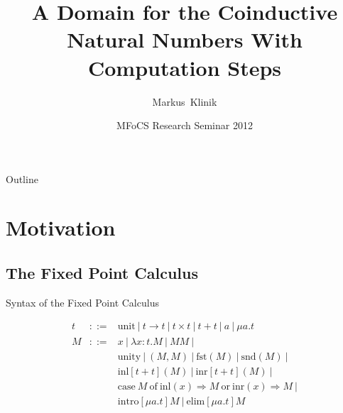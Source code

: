 \documentclass{beamer}
\title
{A Domain for the Coinductive Natural Numbers With Computation Steps}
\author
{Markus~Klinik}
\institute[Radboud University Nijmegen] %
{
  Radboud University Nijmegen
}
\date
{MFoCS Research Seminar 2012}
\newcommand{\arr}{\rightarrow}
\newcommand{\Arr}{\Rightarrow}
\begin{document}
\begin{frame}
  \titlepage
\end{frame}

\begin{frame}{Outline}
  \tableofcontents
\end{frame}





\section{Motivation}

\subsection{The Fixed Point Calculus}


\begin{frame}{Syntax of the Fixed Point Calculus}

  \begin{eqnarray*}
  t & ::= & \text{unit}\ |\ t \arr t\ |\ t \times t\ |\ t + t\ |\ a\ |\ \mu a.t \\
  M & ::= & x\ |\ \lambda x : t . M \ |\ MM \ | \\
    &     & \text{unity}\ |\ (M, M)\ |\ \text{fst}(M)\ |\ \text{snd}(M)\ | \\
    &     & \text{inl}[t + t](M)\ |\ \text{inr}[t + t](M)\ | \\
    &     & \text{case}\ M\ \text{of}\ \text{inl}(x) \Arr M\ \text{or}\ \text{inr}(x) \Arr M\ | \\
    &     & \text{intro}[\mu a.t]M\ |\ \text{elim}[\mu a.t]M
  \end{eqnarray*}

\end{frame}
\end{document}
